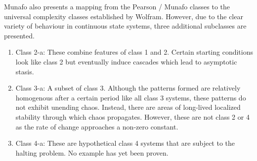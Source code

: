 Munafo also presents a mapping from the Pearson / Munafo classes to the universal complexity classes established by Wolfram. However, due to the clear variety of behaviour in continuous state systems, three additional subclasses are presented.
\begin{enumerate}
    \item Class 2-a: These combine features of class 1 and 2. Certain starting conditions look like class 2 but eventually induce cascades which lead to asymptotic stasis.
    \item Class 3-a: A subset of class 3. Although the patterns formed are relatively homogenous after a certain period like all class 3 systems, these patterns do not exhibit unending chaos. Instead, there are areas of long-lived localized stability through which chaos propagates. However, these are not class 2 or 4 as the rate of change approaches a non-zero constant.
    \item Class 4-a: These are hypothetical class 4 systems that are subject to the halting problem. No example has yet been proven.
\end{enumerate}

